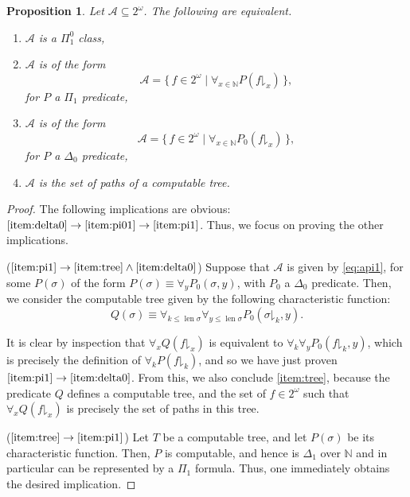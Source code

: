\documentclass{article}
\newtheorem{prop}[theorem]{Proposition}
\theoremstyle{nonumberplain}
\newtheorem{proof}{Proof}
\newcommand{\N}{\mathbb{N}}
\newcommand{\cl}[1]{\mathcal{#1}}
\newcommand{\take}[2]{#1\mathord{\downharpoonright}_{#2}}
\DeclareMathOperator{\len}{\mathrm{len}}
\begin{document}
\begin{prop}
Let $\cl A \subseteq 2^\omega$. The following are equivalent.
\begin{enumerate}
\item\label{item:pi01} $\cl A$ is a $\Pi^0_1$ class,
\item\label{item:pi1} $\cl A$ is of the form
\begin{equation}\label{eq:api1}
\cl A = \{\, f \in 2^\omega \mid \forall_{x \in \N} P(\take f x) \,\},
\end{equation}
for $P$ a $\Pi_1$ predicate,
\item\label{item:delta0} $\cl A$ is of the form
\begin{equation}
\cl A = \{\, f \in 2^\omega \mid \forall_{x \in \N} P_0(\take f x) \,\},
\end{equation}
for $P$ a $\Delta_0$ predicate,
\item\label{item:tree} $\cl A$ is the set of paths of a computable tree.
\end{enumerate}
\end{prop}

\begin{proof}
The following implications are obvious: $\ref{item:delta0} \rightarrow \ref{item:pi01} \rightarrow \ref{item:pi1}$. Thus, we focus on proving the other implications.

($\ref{item:pi1} \rightarrow \ref{item:tree} \land \ref{item:delta0}$) Suppose that $\cl A$ is given by \eqref{eq:api1}, for some $P(\sigma)$ of the form $P(\sigma) \equiv \forall_y P_0(\sigma, y)$, with $P_0$ a $\Delta_0$ predicate. Then, we consider the computable tree given by the following characteristic function:
\begin{equation}
Q(\sigma) \equiv \forall_{k \leq \len \sigma} \forall_{y \leq \len\sigma} P_0(\take \sigma k, y).
\end{equation}

It is clear by inspection that $\forall_x Q(\take f x)$ is equivalent to $\forall_k \forall_y P_0(\take f k, y)$, which is precisely the definition of $\forall_k P(\take f k)$, and so we have just proven $\ref{item:pi1} \rightarrow \ref{item:delta0}$. From this, we also conclude \ref{item:tree}, because the predicate $Q$ defines a computable tree, and the set of $f \in 2^\omega$ such that $\forall_x Q(\take f x)$ is precisely the set of paths in this tree.

($\ref{item:tree} \rightarrow \ref{item:pi1}$) Let $T$ be a computable tree, and let $P(\sigma)$ be its characteristic function. Then, $P$ is computable, and hence is $\Delta_1$ over $\N$ and in particular can be represented by a $\Pi_1$ formula. Thus, one immediately obtains the desired implication.
\end{proof}
\end{document}
